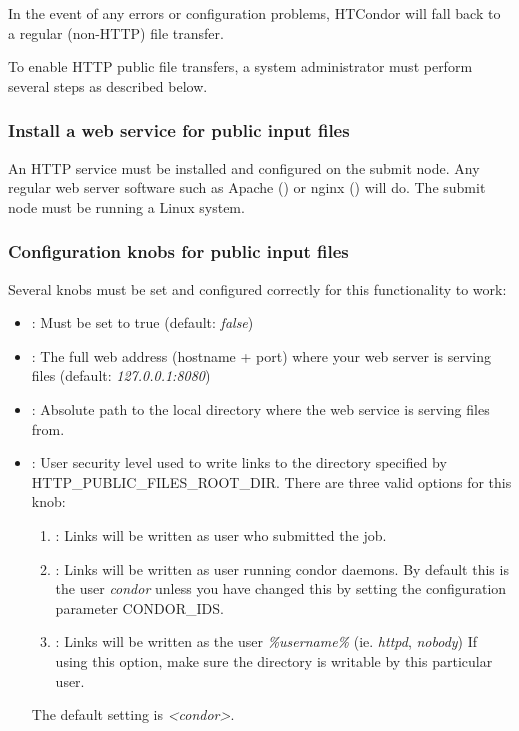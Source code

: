 In the event of any errors or configuration problems, HTCondor will fall back 
to a regular (non-HTTP) file transfer.

To enable HTTP public file transfers, a system administrator must perform
several steps as described below.

\subsubsection{\label{sec:HTTP-Public-Files-Web-Server}Install a web service
for public input files}

An HTTP service must be installed and configured on the submit node. Any regular 
web server software such as Apache () or nginx 
() will do. The submit node must be running a Linux 
system.

\subsubsection{\label{sec:HTTP-Public-Files-Knobs}Configuration knobs for
public input files}

Several knobs must be set and configured correctly for this functionality to
work:

\begin{itemize}
\item {}: Must be set to true (default: 
\emph{false})
\item {}: The full web address (hostname + port) 
where your web server is serving files (default: \emph{127.0.0.1:8080})
\item {}: Absolute path to the local directory
where the web service is serving files from.
\item {}: User security level used to write links to
the directory specified by HTTP\_PUBLIC\_FILES\_ROOT\_DIR. There are three valid 
options for this knob:
\begin{enumerate}
\item {}: Links will be written as user who submitted the job.
\item {}: Links will be written as user running condor daemons. 
By default this is the user \emph{condor} unless you have changed this by 
setting the configuration parameter CONDOR\_IDS.
\item {}: Links will be written as the user 
\emph{\%username\%} (ie. \emph{httpd}, \emph{nobody}) If using this option, 
make sure the directory is writable by this particular user.
\end{enumerate}
The default setting is \emph{<condor>}.
\end{itemize}

